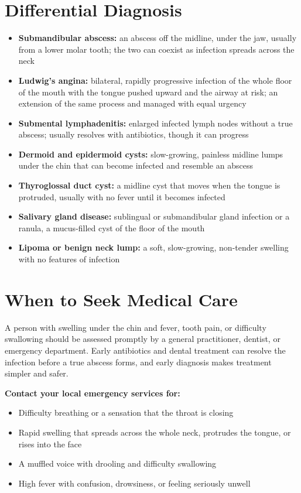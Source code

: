 \section*{Differential Diagnosis}
\begin{itemize}
    \item \textbf{Submandibular abscess:} an abscess off the midline, under the jaw, usually from a lower molar tooth; the two can coexist as infection spreads across the neck
    \item \textbf{Ludwig's angina:} bilateral, rapidly progressive infection of the whole floor of the mouth with the tongue pushed upward and the airway at risk; an extension of the same process and managed with equal urgency
    \item \textbf{Submental lymphadenitis:} enlarged infected lymph nodes without a true abscess; usually resolves with antibiotics, though it can progress
    \item \textbf{Dermoid and epidermoid cysts:} slow-growing, painless midline lumps under the chin that can become infected and resemble an abscess
    \item \textbf{Thyroglossal duct cyst:} a midline cyst that moves when the tongue is protruded, usually with no fever until it becomes infected
    \item \textbf{Salivary gland disease:} sublingual or submandibular gland infection or a ranula, a mucus-filled cyst of the floor of the mouth
    \item \textbf{Lipoma or benign neck lump:} a soft, slow-growing, non-tender swelling with no features of infection
\end{itemize}

\section*{When to Seek Medical Care}
A person with swelling under the chin and fever, tooth pain, or difficulty swallowing should be assessed promptly by a general practitioner, dentist, or emergency department. Early antibiotics and dental treatment can resolve the infection before a true abscess forms, and early diagnosis makes treatment simpler and safer.

\textbf{Contact your local emergency services for:}
\begin{itemize}
    \item Difficulty breathing or a sensation that the throat is closing
    \item Rapid swelling that spreads across the whole neck, protrudes the tongue, or rises into the face
    \item A muffled voice with drooling and difficulty swallowing
    \item High fever with confusion, drowsiness, or feeling seriously unwell
\end{itemize}

